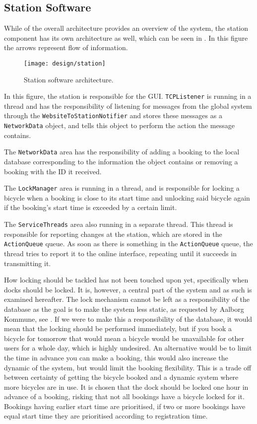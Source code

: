 \subsection{Station Software}\label{subsec:stationsoftdesfgi}
While  of the overall architecture provides an overview of the system, the station component has its own architecture as well, which can be seen in . In this figure the arrows represent flow of information.

\begin{figure}[h]
	\centering
	\texttt{[image: design/station]}
	\caption{Station software architecture.}\label{fig:stationarch}
\end{figure}

In this figure, the station is responsible for the GUI.
\texttt{TCPListener} is running in a thread and has the responsibility of listening for messages from the global system through the \texttt{Website\-ToStationNotifier} and stores these messages as a \texttt{NetworkData} object, and tells this object to perform the action the message contains.

The \texttt{NetworkData} area has the responsibility of adding a booking to the local database corresponding to the information the object contains or removing a booking with the ID it received.

The \texttt{LockManager} area is running in a thread, and is responsible for locking a bicycle when a booking is close to its start time and unlocking said bicycle again if the booking's start time is exceeded by a certain limit.

The \texttt{ServiceThreads} area also running in a separate thread.
This thread is responsible for reporting changes at the station, which are stored in the \texttt{ActionQueue} queue.
As soon as there is something in the \texttt{ActionQueue} queue, the thread tries to report it to the online interface, repeating until it succeeds in transmitting it.

How locking should be tackled has not been touched upon yet, specifically when docks should be locked.
It is, however, a central part of the system and as such is examined hereafter.
The lock mechanism cannot be left as a responsibility of the database as the goal is to make the system less static, as requested by Aalborg Kommune, see .
If we were to make this a responsibility of the database, it would mean that the locking should be performed immediately, but if you book a bicycle for tomorrow that would mean a bicycle would be unavailable for other users for a whole day, which is highly undesired.
An alternative would be to limit the time in advance you can make a booking, this would also increase the dynamic of the system, but would limit the booking flexibility.
This is a trade off between certainty of getting the bicycle booked and a dynamic system where more bicycles are in use.
It is chosen that the dock should be locked one hour in advance of a booking, risking that not all bookings have a bicycle locked for it.
Bookings having earlier start time are prioritised, if two or more bookings have equal start time they are prioritised according to registration time.
